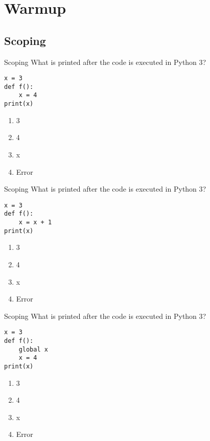\documentclass[9pt]{beamer}
\title{\themidterm}
\author{\theauthors}
\institute{\theorganization}
\date{\thedate}
\begin{document}

\begin{frame}
  \titlepage
\end{frame}

\section{Warmup}
\subsection{Scoping}
\begin{frame}[fragile]{Scoping}
  What is printed after the code is executed in Python 3?

  \begin{lstlisting}
x = 3
def f():
    x = 4
print(x)
  \end{lstlisting}

  \begin{enumerate}
    \item
      \alert<2>{3}
    \item
      4
    \item
      x
    \item
      Error
  \end{enumerate}
\end{frame}

\begin{frame}[fragile]{Scoping}
  What is printed after the code is executed in Python 3?

  \begin{lstlisting}
x = 3
def f():
    x = x + 1
print(x)
  \end{lstlisting}

  \begin{enumerate}
    \item
      3
    \item
      4
    \item
      x
    \item
      \alert<2>{Error}
  \end{enumerate}
\end{frame}

\begin{frame}[fragile]{Scoping}
  What is printed after the code is executed in Python 3?

  \begin{lstlisting}
x = 3
def f():
    global x
    x = 4
print(x)
  \end{lstlisting}

  \begin{enumerate}
    \item
      3
    \item
      \alert<2>{4}
    \item
      x
    \item
      Error
  \end{enumerate}
\end{frame}
\end{document}
